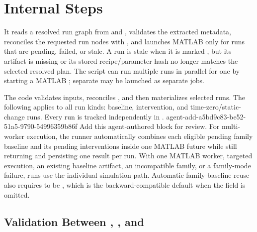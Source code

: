 \documentclass[11pt]{article}
\begin{document}
\section*{Internal Steps}
\label{sec:simulate-stale-run-definition}
It reads a resolved run graph from  and , validates the extracted \termSimulator metadata, reconciles the requested run nodes with , and launches MATLAB only for runs that are pending, failed, or stale.
A run is stale when it is marked , but its artifact is missing or its stored recipe/parameter hash no longer matches the selected resolved plan.
The script can run multiple runs in parallel for one \termSimulator by starting a MATLAB ; separate \termSimulators may be launched as separate jobs.

The code validates inputs, reconciles , and then materializes selected runs.
The following applies to all run kinds: baseline, intervention, and time-zero/static-change runs.
Every run is tracked independently in . 
\agentProposedEdit
  {agent-add-a5bd9c83-be52-51a5-9790-54996359b86f}
  {Add this agent-authored block for review.}
  {}
  {For multi-worker execution, the runner automatically combines each eligible pending family baseline and its pending interventions inside one MATLAB future while still returning and persisting one result per run.
With one MATLAB worker, targeted execution, an existing baseline artifact, an incompatible family, or a family-mode failure, runs use the individual simulation path.
Automatic family-baseline reuse also requires  to be , which is the backward-compatible default when the field is omitted.}

\subsection*{Validation Between , , and }
\end{document}
